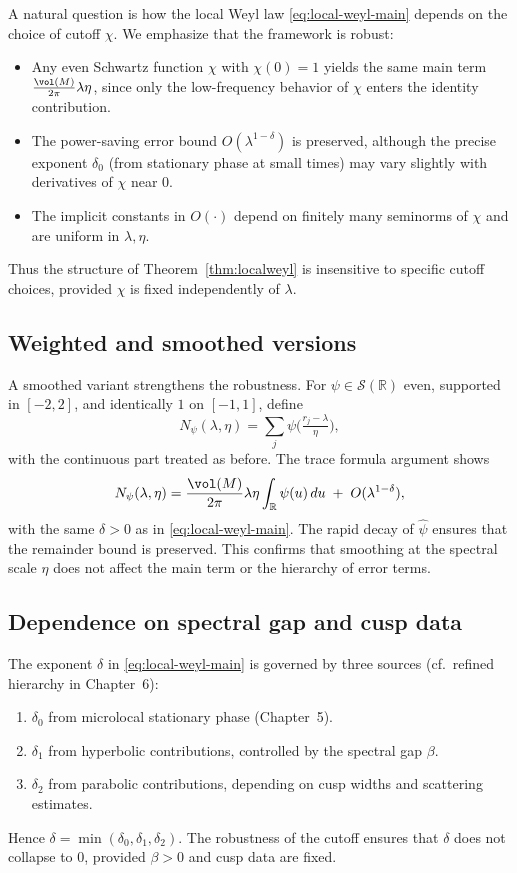 A natural question is how the local Weyl law \eqref{eq:local-weyl-main} depends on the choice of cutoff $\chi$.  
We emphasize that the framework is robust:

\begin{itemize}
  \item Any even Schwartz function $\chi$ with $\chi(0)=1$ yields the same main term 
  $\tfrac{\vol(M)}{2\pi}\lambda\eta$, since only the low-frequency behavior of $\chi$ enters the identity contribution.
  \item The power-saving error bound $O(\lambda^{1-\delta})$ is preserved, although the precise exponent $\delta_0$ (from stationary phase at small times) may vary slightly with derivatives of $\chi$ near $0$. 
  \item The implicit constants in $O(\cdot)$ depend on finitely many seminorms of $\chi$ and are uniform in $\lambda, \eta$.
\end{itemize}

Thus the structure of Theorem~\ref{thm:localweyl} is insensitive to specific cutoff choices, provided $\chi$ is fixed independently of $\lambda$.

\subsection{Weighted and smoothed versions}

A smoothed variant strengthens the robustness. For $\psi\in\mathcal{S}(\mathbb{R})$ even, supported in $[-2,2]$, and identically $1$ on $[-1,1]$, define
\[
N_\psi(\lambda,\eta)=\sum_j \psi\!\Big(\tfrac{r_j-\lambda}{\eta}\Big),
\]
with the continuous part treated as before. The trace formula argument shows
\[
N_\psi(\lambda,\eta) = \frac{\vol(M)}{2\pi}\lambda\eta \int_{\mathbb{R}}\psi(u)\,du \;+\; O(\lambda^{1-\delta}),
\]
with the same $\delta>0$ as in \eqref{eq:local-weyl-main}.  
The rapid decay of $\widehat{\psi}$ ensures that the remainder bound is preserved.  
This confirms that smoothing at the spectral scale $\eta$ does not affect the main term or the hierarchy of error terms.

\subsection{Dependence on spectral gap and cusp data}

The exponent $\delta$ in \eqref{eq:local-weyl-main} is governed by three sources (cf.~refined hierarchy in Chapter~6):
\begin{enumerate}
  \item $\delta_0$ from microlocal stationary phase (Chapter~5).
  \item $\delta_1$ from hyperbolic contributions, controlled by the spectral gap $\beta$.
  \item $\delta_2$ from parabolic contributions, depending on cusp widths and scattering estimates.
\end{enumerate}
Hence $\delta=\min(\delta_0,\delta_1,\delta_2)$.  
The robustness of the cutoff ensures that $\delta$ does not collapse to $0$, provided $\beta>0$ and cusp data are fixed.

